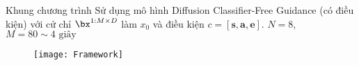 \begin{frame}{Khung chương trình}
	Sử dụng mô hình Diffusion Classifier-Free Guidance (có điều kiện) với cử chỉ $\bx^{1:M \times D}$ làm $x_0$ và điều kiện $c = [{\mathbf{s}, \mathbf{a}, \mathbf{e}}]$. $N = 8$, $M = 80 \sim \text{4 giây}$
		\begin{figure}[h]
			\centering
			\texttt{[image: Framework]}
		\end{figure}
	
%
%

\end{frame}





